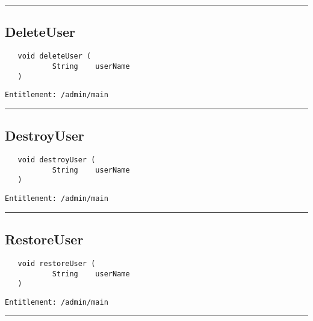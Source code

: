 \rule{12cm}{2pt}
\subsection{DeleteUser}
\label{Api:DeleteUser}
\begin{verbatim}
   void deleteUser (
           String    userName
   )
\end{verbatim}
\begin{Verbatim}[fontsize=\small, formatcom=\color{Maroon}]
  Entitlement: /admin/main
\end{Verbatim}



\rule{12cm}{2pt}
\subsection{DestroyUser}
\label{Api:DestroyUser}
\begin{verbatim}
   void destroyUser (
           String    userName
   )
\end{verbatim}
\begin{Verbatim}[fontsize=\small, formatcom=\color{Maroon}]
  Entitlement: /admin/main
\end{Verbatim}



\rule{12cm}{2pt}
\subsection{RestoreUser}
\label{Api:RestoreUser}
\begin{verbatim}
   void restoreUser (
           String    userName
   )
\end{verbatim}
\begin{Verbatim}[fontsize=\small, formatcom=\color{Maroon}]
  Entitlement: /admin/main
\end{Verbatim}



\rule{12cm}{2pt}
